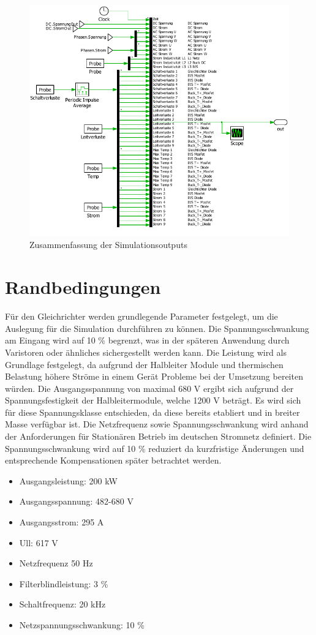 \begin{figure}
\centering
\includegraphics[width=0.9\linewidth]{content/Grafiken/Plecs_Out}
\caption{Zusammenfassung der Simulationsoutputs}
\label{fig:plecsout}
\end{figure}


\section{Randbedingungen}
Für den Gleichrichter werden grundlegende Parameter festgelegt, um die Auslegung für die Simulation durchführen zu können. Die Spannungsschwankung am Eingang wird auf 10 \% begrenzt, was in der späteren Anwendung durch Varistoren oder ähnliches sichergestellt werden kann. Die Leistung wird als Grundlage festgelegt, da aufgrund der Halbleiter Module und thermischen Belastung höhere Ströme in einem Gerät Probleme bei der Umsetzung bereiten würden. Die Ausgangsspannung von maximal 680 V ergibt sich aufgrund der Spannungsfestigkeit der Halbleitermodule, welche 1200 V beträgt. Es wird sich für diese Spannungsklasse entschieden, da diese bereits etabliert und in breiter Masse verfügbar ist. Die Netzfrequenz sowie Spannungsschwankung wird anhand der Anforderungen für Stationären Betrieb im deutschen Stromnetz definiert. Die Spannungsschwankung wird auf 10 \% reduziert da kurzfristige Änderungen und entsprechende Kompensationen später betrachtet werden.  \\

\begin{itemize}
\item Ausgangsleistung: 200 kW
\item Ausgangsspannung: 482-680 V
\item Ausgangsstrom: 	295 A
\item \gls{Ull}:		617 V
\item Netzfrequenz		50 Hz
\item Filterblindleistung: 3 \%
\item Schaltfrequenz: 20 kHz
\item Netzspannungsschwankung: 10 \%
\end{itemize}


